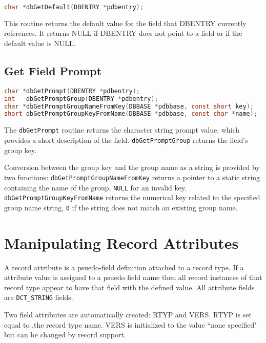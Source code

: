 \begin{lstlisting}[language=C]
char *dbGetDefault(DBENTRY *pdbentry);
\end{lstlisting}

This routine returns the default value for the field that DBENTRY currently references. It returns NULL if DBENTRY 
does not point to a field or if the default value is NULL.

\subsection{Get Field Prompt}
\label{subsec:Get Field Prompt}

\begin{lstlisting}[language=C]
char *dbGetPrompt(DBENTRY *pdbentry);
int   dbGetPromptGroup(DBENTRY *pdbentry);
char *dbGetPromptGroupNameFromKey(DBBASE *pdbbase, const short key);
short dbGetPromptGroupKeyFromName(DBBASE *pdbbase, const char *name);
\end{lstlisting}

The \verb|dbGetPrompt| routine returns the character string prompt value, which provides a short description of the field.
\verb|dbGetPromptGroup| returns the field's group key.

Conversion between the group key and the group name as a string is provided by two functions:
\verb|dbGetPromptGroupNameFromKey| returns a pointer to a static string containing the name of the group,
\verb|NULL| for an invalid key.
\verb|dbGetPromptGroupKeyFromName| returns the numerical key related to the specified group name string,
\verb|0| if the string does not match an existing group name.

\section{Manipulating Record Attributes}

A record attribute is a psuedo-field definition attached to a record type. If a attribute value is assigned to a psuedo field 
name then all record instances of that record type appear to have that field with the defined value. All attribute fields are 
\verb|DCT_STRING| fields.

Two field attributes are automatically created: RTYP and VERS. RTYP is set equal to ,the record type name. VERS is 
initialized to the value ``none specified" but can be changed by record support.

